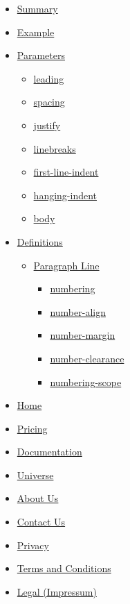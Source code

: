 \begin{itemize}
\tightlist
\item
  \hyperref[summary]{Summary}
\item
  \hyperref[example]{Example}
\item
  \hyperref[parameters]{Parameters}

  \begin{itemize}
  \tightlist
  \item
    \hyperref[parameters-leading]{leading}
  \item
    \hyperref[parameters-spacing]{spacing}
  \item
    \hyperref[parameters-justify]{justify}
  \item
    \hyperref[parameters-linebreaks]{linebreaks}
  \item
    \hyperref[parameters-first-line-indent]{first-line-indent}
  \item
    \hyperref[parameters-hanging-indent]{hanging-indent}
  \item
    \hyperref[parameters-body]{body}
  \end{itemize}
\item
  \hyperref[definitions]{Definitions}

  \begin{itemize}
  \tightlist
  \item
    \hyperref[definitions-line]{Paragraph Line}

    \begin{itemize}
    \tightlist
    \item
      \hyperref[definitions-line-numbering]{numbering}
    \item
      \hyperref[definitions-line-number-align]{number-align}
    \item
      \hyperref[definitions-line-number-margin]{number-margin}
    \item
      \hyperref[definitions-line-number-clearance]{number-clearance}
    \item
      \hyperref[definitions-line-numbering-scope]{numbering-scope}
    \end{itemize}
  \end{itemize}
\end{itemize}

\begin{itemize}
\tightlist
\item
  \href{/}{Home}
\item
  \href{/pricing/}{Pricing}
\item
  \href{/docs/}{Documentation}
\item
  \href{/universe/}{Universe}
\item
  \href{/about/}{About Us}
\item
  \href{/contact/}{Contact Us}
\item
  \href{/privacy/}{Privacy}
\item
  \href{https://typst.app/terms}{Terms and Conditions}
\item
  \href{/legal/}{Legal (Impressum)}
\end{itemize}

